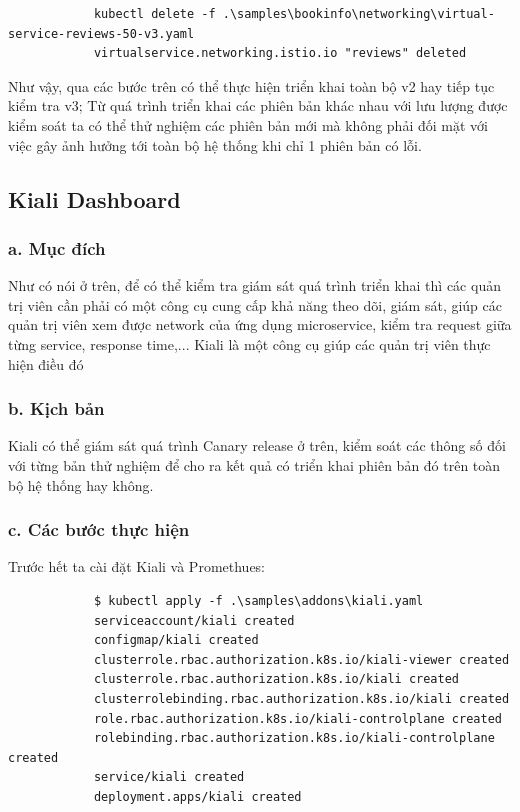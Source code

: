 \documentclass[14pt,a4paper]{book}
\begin{document}
{{\begin{lstlisting}
			kubectl delete -f .\samples\bookinfo\networking\virtual-service-reviews-50-v3.yaml
			virtualservice.networking.istio.io "reviews" deleted
		\end{lstlisting}
		Như vậy, qua các bước trên có thể thực hiện triển khai toàn bộ v2 hay tiếp tục kiểm tra v3; Từ quá trình triển khai các phiên bản khác nhau với lưu lượng được kiểm soát ta có thể thử nghiệm các phiên bản mới mà không phải đối mặt với việc gây ảnh hưởng tới toàn bộ hệ thống khi chỉ 1 phiên bản có lỗi.
		\subsection{Kiali Dashboard}
		\subsubsection{a. Mục đích}
		Như có nói ở trên, để có thể kiểm tra giám sát quá trình triển khai thì các quản trị viên cần phải có một công cụ cung cấp khả năng theo dõi, giám sát, giúp các quản trị viên xem được network của ứng dụng microservice, kiểm tra request giữa từng service, response time,... Kiali là một công cụ giúp các quản trị viên thực hiện điều đó
		\subsubsection{b. Kịch bản}
		Kiali có thể giám sát quá trình Canary release ở trên, kiểm soát các thông số đối với từng bản thử nghiệm để cho ra kết quả có triển khai phiên bản đó trên toàn bộ hệ thống hay không.
		\subsubsection{c. Các bước thực hiện}
		Trước hết ta cài đặt Kiali và Promethues:
		\begin{lstlisting}
			$ kubectl apply -f .\samples\addons\kiali.yaml
			serviceaccount/kiali created
			configmap/kiali created
			clusterrole.rbac.authorization.k8s.io/kiali-viewer created
			clusterrole.rbac.authorization.k8s.io/kiali created
			clusterrolebinding.rbac.authorization.k8s.io/kiali created
			role.rbac.authorization.k8s.io/kiali-controlplane created
			rolebinding.rbac.authorization.k8s.io/kiali-controlplane created
			service/kiali created
			deployment.apps/kiali created
			

\end{lstlisting}}}
\end{document}
